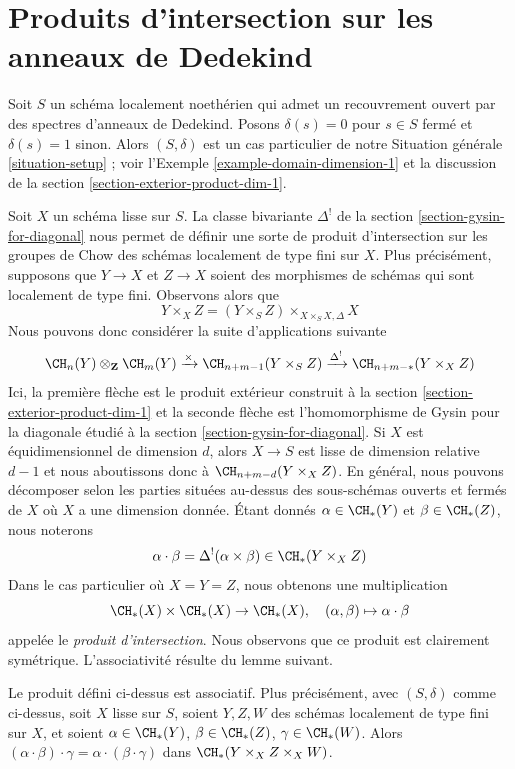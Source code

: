 \section{Produits d'intersection sur les anneaux de Dedekind}
\label{section-intersection-product-dim-1}

\noindent
Soit $S$ un schéma localement noethérien qui admet un recouvrement ouvert
par des spectres d'anneaux de Dedekind. Posons $\delta(s) = 0$ pour $s \in S$ fermé
et $\delta(s) = 1$ sinon. Alors $(S, \delta)$ est un cas particulier de notre
Situation générale \ref{situation-setup} ; voir
l'Exemple \ref{example-domain-dimension-1} et la discussion de la
section \ref{section-exterior-product-dim-1}.

\medskip\noindent
Soit $X$ un schéma lisse sur $S$. La classe bivariante $\Delta^!$
de la section \ref{section-gysin-for-diagonal} nous permet de définir une sorte de
produit d'intersection sur les groupes de Chow des schémas localement de type fini sur $X$.
Plus précisément, supposons que $Y \to X$ et $Z \to X$ soient des morphismes de schémas
qui sont localement de type fini. Observons alors que
$$
Y \times_X Z =  (Y \times_S Z) \times_{X \times_S X, \Delta} X
$$
Nous pouvons donc considérer la suite d'applications suivante
$$
\CH_n(Y) \otimes_\mathbf{Z} \CH_m(Y)
\xrightarrow{\times}
\CH_{n + m - 1}(Y \times_S Z)
\xrightarrow{\Delta^!}
\CH_{n + m - *}(Y \times_X Z)
$$
Ici, la première flèche est le produit extérieur construit à la
section \ref{section-exterior-product-dim-1} et la seconde flèche
est l'homomorphisme de Gysin pour la diagonale étudié à la
section \ref{section-gysin-for-diagonal}. Si $X$ est équidimensionnel
de dimension $d$, alors $X \to S$ est lisse de dimension relative $d - 1$
et nous aboutissons donc à $\CH_{n + m - d}(Y \times_X Z)$.
En général, nous pouvons décomposer selon les parties situées au-dessus des sous-schémas
ouverts et fermés de $X$ où $X$ a une dimension donnée.
Étant donnés $\alpha \in \CH_*(Y)$ et $\beta \in \CH_*(Z)$, nous noterons
$$
\alpha \cdot \beta = \Delta^!(\alpha \times \beta)
\in \CH_*(Y \times_X Z)
$$
Dans le cas particulier où $X = Y = Z$, nous obtenons une multiplication
$$
\CH_*(X) \times \CH_*(X) \to \CH_*(X),\quad
(\alpha, \beta) \mapsto \alpha \cdot \beta
$$
appelée le {\it produit d'intersection}. Nous observons que
ce produit est clairement symétrique. L'associativité résulte du
lemme suivant.

\begin{lemma}
\label{lemma-associative-dim-1}
Le produit défini ci-dessus est associatif. Plus précisément, avec
$(S, \delta)$ comme ci-dessus, soit $X$ lisse sur $S$,
soient $Y, Z, W$ des schémas localement de type fini sur $X$, et soient
$\alpha \in \CH_*(Y)$, $\beta \in \CH_*(Z)$, $\gamma \in \CH_*(W)$.
Alors $(\alpha \cdot \beta) \cdot \gamma =
\alpha \cdot (\beta \cdot \gamma)$ dans $\CH_*(Y \times_X Z \times_X W)$.
\end{lemma}

